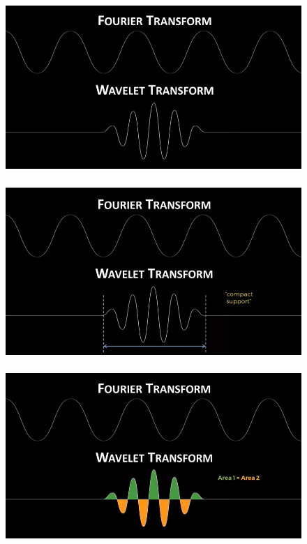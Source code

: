 \documentclass{beamer}
\begin{document}
\begin{frame}

\begin{figure}
\centering
\includegraphics[width=\textwidth, height=6.5cm]{imgs/FvsW1}
\end{figure}

\end{frame}

\begin{frame}
\begin{figure}
\centering
\includegraphics[width=\textwidth, height=6.5cm]{imgs/FvsW2}
\end{figure}
\end{frame}


\begin{frame}
\begin{figure}
\centering
\includegraphics[width=\textwidth, height=6.5cm]{imgs/FvsW3}
\end{figure}
\end{frame}
\end{document}
